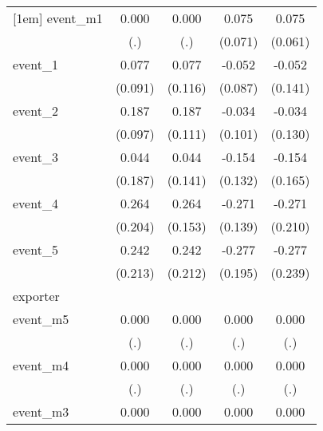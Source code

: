 {\begin{tabular}{l*{4}{c}}
[1em]
event\_m1    &       0.000         &       0.000         &       0.075         &       0.075         \\
            &         (.)         &         (.)         &     (0.071)         &     (0.061)         \\
[1em]
event\_1     &       0.077         &       0.077         &      -0.052         &      -0.052         \\
            &     (0.091)         &     (0.116)         &     (0.087)         &     (0.141)         \\
[1em]
event\_2     &       0.187         &       0.187         &      -0.034         &      -0.034         \\
            &     (0.097)         &     (0.111)         &     (0.101)         &     (0.130)         \\
[1em]
event\_3     &       0.044         &       0.044         &      -0.154         &      -0.154         \\
            &     (0.187)         &     (0.141)         &     (0.132)         &     (0.165)         \\
[1em]
event\_4     &       0.264         &       0.264         &      -0.271         &      -0.271         \\
            &     (0.204)         &     (0.153)         &     (0.139)         &     (0.210)         \\
[1em]
event\_5     &       0.242         &       0.242         &      -0.277         &      -0.277         \\
            &     (0.213)         &     (0.212)         &     (0.195)         &     (0.239)         \\
\hline
exporter    &                     &                     &                     &                     \\
event\_m5    &       0.000         &       0.000         &       0.000         &       0.000         \\
            &         (.)         &         (.)         &         (.)         &         (.)         \\
[1em]
event\_m4    &       0.000         &       0.000         &       0.000         &       0.000         \\
            &         (.)         &         (.)         &         (.)         &         (.)         \\
[1em]
event\_m3    &       0.000         &       0.000         &       0.000         &       0.000         \\

\end{tabular}}
